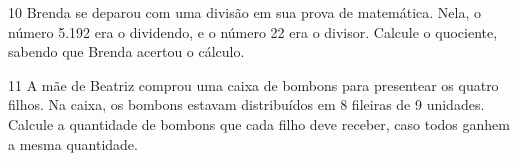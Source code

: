 \num{10} Brenda se deparou com uma divisão em sua prova de matemática. 
Nela, o número 5.192 era o dividendo, e o número 22 era o divisor. 
Calcule o quociente, sabendo que Brenda acertou o cálculo.



\num{11} A mãe de Beatriz comprou uma caixa de bombons para presentear os quatro filhos. 
Na caixa, os bombons estavam distribuídos em 8 fileiras de 9 unidades. 
Calcule a quantidade de bombons que cada filho deve receber, caso todos ganhem a mesma quantidade.

